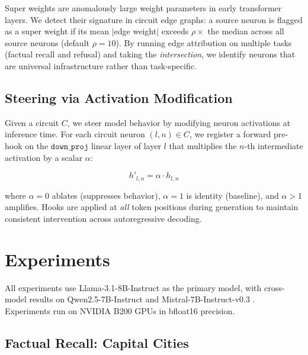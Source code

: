 \documentclass[11pt]{article}
\begin{document}
Super weights \citep{yu2024superweights} are anomalously large weight parameters in early transformer layers.
We detect their signature in circuit edge graphs: a source neuron is flagged as a super weight if its mean $|$edge weight$|$ exceeds $\rho \times$ the median across all source neurons (default $\rho = 10$).
By running edge attribution on multiple tasks (factual recall and refusal) and taking the \emph{intersection}, we identify neurons that are universal infrastructure rather than task-specific.

\subsection{Steering via Activation Modification}
\label{sec:steering}

Given a circuit $C$, we steer model behavior by modifying neuron activations at inference time.
For each circuit neuron $(l, n) \in C$, we register a forward pre-hook on the $\texttt{down\_proj}$ linear layer of layer $l$ that multiplies the $n$-th intermediate activation by a scalar $\alpha$:

\begin{equation}
    h'_{l,n} = \alpha \cdot h_{l,n}
\end{equation}

where $\alpha = 0$ ablates (suppresses behavior), $\alpha = 1$ is identity (baseline), and $\alpha > 1$ amplifies.
Hooks are applied at \emph{all} token positions during generation to maintain consistent intervention across autoregressive decoding.


\section{Experiments}
\label{sec:experiments}

All experiments use Llama-3.1-8B-Instruct \citep{dubey2024llama3} as the primary model, with cross-model results on Qwen2.5-7B-Instruct \citep{yang2024qwen2} and Mistral-7B-Instruct-v0.3 \citep{jiang2023mistral}.
Experiments run on NVIDIA B200 GPUs in bfloat16 precision.

\subsection{Factual Recall: Capital Cities}
\label{sec:capitals}
\end{document}
